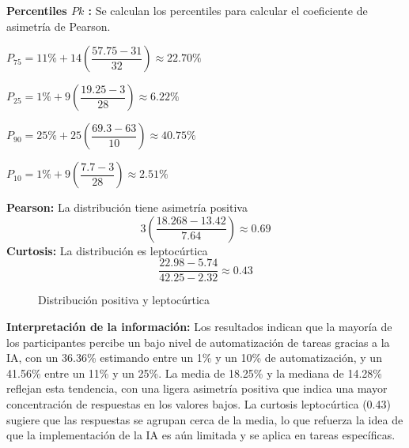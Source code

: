 \vspace{-0.5cm}
\textbf{Percentiles $Pk$ :} Se calculan los percentiles para calcular el coeficiente de asimetría de Pearson.
\begin{multicols}{2}

	$P_{75} = 11\% + 14\left(\dfrac{57.75 - 31}{32}\right) \approx 22.70\%$

	$P_{25} = 1\% + 9\left(\dfrac{19.25 - 3}{28}\right) \approx 6.22\%$

	$P_{90} = 25\% + 25\left(\dfrac{69.3 - 63}{10}\right) \approx 40.75\%$

	$P_{10} = 1\% + 9\left(\dfrac{7.7 - 3}{28}\right) \approx 2.51\%$
\end{multicols}
\begin{multicols}{2}
	\textbf{Pearson:} La distribución tiene asimetría positiva
	\begin{equation*}
		3\left(\dfrac{18.268-13.42}{7.64}\right) \approx 0.69
	\end{equation*}
	\textbf{Curtosis:} La distribución es leptocúrtica
	\begin{equation*}
		\dfrac{22.98-5.74}{42.25-2.32} \approx 0.43
	\end{equation*}
\end{multicols}
\vspace{-0.5cm}
\begin{figure}[H]
	\centering
	\hspace*{-1.2cm}
	\vspace{-0.4cm}
	\caption{Distribución positiva y leptocúrtica}
\end{figure}
\vspace{-0.8cm}
\textbf{Interpretación de la información:} Los resultados indican que la mayoría de los participantes percibe un bajo nivel de automatización de tareas gracias a la IA, con un 36.36\% estimando entre un 1\% y un 10\% de automatización, y un 41.56\% entre un 11\% y un 25\%. La media de 18.25\% y la mediana de 14.28\% reflejan esta tendencia, con una ligera asimetría positiva que indica una mayor concentración de respuestas en los valores bajos. La curtosis leptocúrtica (0.43) sugiere que las respuestas se agrupan cerca de la media, lo que refuerza la idea de que la implementación de la IA es aún limitada y se aplica en tareas específicas.

